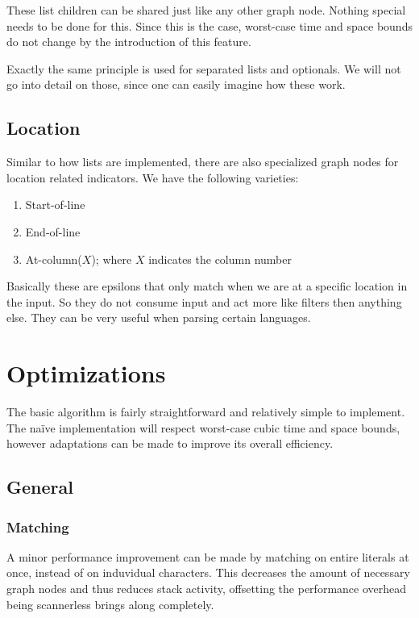 \documentclass[a4paper,10pt]{article}
\begin{document}
These list children can be shared just like any other graph node. Nothing special needs to be done for this. Since this is the case, worst-case time and space bounds do not change by the introduction of this feature.

Exactly the same principle is used for separated lists and optionals. We will not go into detail on those, since one can easily imagine how these work.

\subsection{Location}

Similar to how lists are implemented, there are also specialized graph nodes for location related indicators. We have the following varieties:
\begin{enumerate}
 \setlength{\itemsep}{0pt}
 \setlength{\parskip}{0pt}
 \setlength{\parsep}{0pt}
 
 \item Start-of-line
 \item End-of-line
 \item At-column($X$); where $X$ indicates the column number
\end{enumerate}
Basically these are epsilons that only match when we are at a specific location in the input. So they do not consume input and act more like filters then anything else. They can be very useful when parsing certain languages.

\section{Optimizations}
\label{chap:optimizations}

The basic algorithm is fairly straightforward and relatively simple to implement. The naïve implementation will respect worst-case cubic time and space bounds, however adaptations can be made to improve its overall efficiency.

\subsection{General}

\subsubsection{Matching}
A minor performance improvement can be made by matching on entire literals at once, instead of on induvidual characters. This decreases the amount of necessary graph nodes and thus reduces stack activity, offsetting the performance overhead being scannerless brings along completely.
\end{document}
